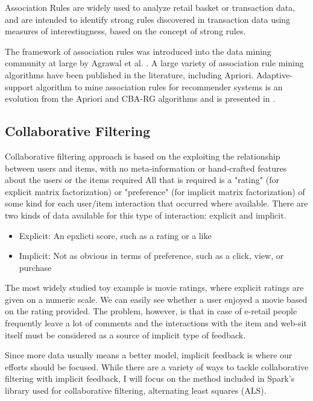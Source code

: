 \documentclass[12pt]{article}
\begin{document}
Association Rules are widely used to analyze retail basket or transaction data, and are intended to identify strong rules discovered in transaction data using measures of interestingness, based on the concept of strong rules.

The framework of association rules was introduced into the data mining community at large by Agrawal et al. \cite{AZM}. A large variety of association rule mining algorithms have been published in the literature, including Apriori.   Adaptive-support algorithm to mine association rules for recommender systems is an evolution from the Apriori and CBA-RG algorithms and is presented in \cite{LAR}.

\subsection{Collaborative Filtering}
Collaborative filtering approach is based on the exploiting the relationship between users and items, with no meta-information or hand-crafted features about the users or the items required All that is required is a "rating" (for explicit matrix factorization) or "preference" (for implicit matrix factorization) of some kind for each user/item interaction that occurred where available. There are two kinds of data available for this type of interaction: explicit and implicit.

\begin{itemize}
	\item Explicit: An epxlicti score, such as a rating or a like
	\item Implicit: Not as obvious in terms of preference, such as a click, view, or purchase
\end{itemize}

The most widely studied toy example is movie ratings, where explicit ratings are given on a numeric scale. We can easily see whether a user enjoyed a movie based on the rating provided. The problem, however, is that in case of e-retail people frequently leave a lot of comments and the interactions with the item and web-sit itself must be considered as a source of implicit type of feedback.

Since more data usually means a better model, implicit feedback is where our efforts should be focused. While there are a variety of ways to tackle collaborative filtering with implicit feedback, I will focus on the method included in Spark’s library used for collaborative filtering, alternating least squares (ALS).
\end{document}
